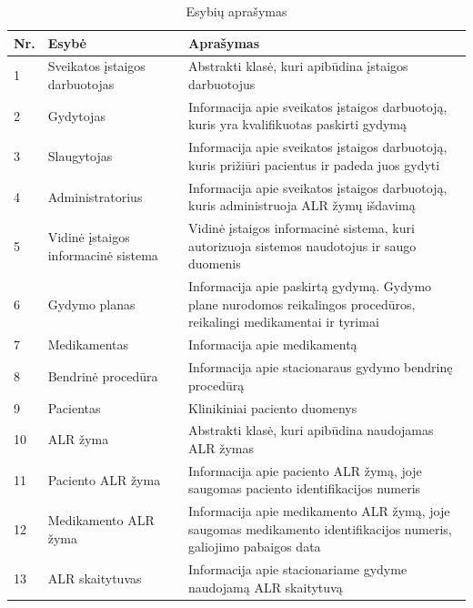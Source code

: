 \begin{table}[!ht]
    \centering
    \renewcommand{\arraystretch}{1.2}
    \renewcommand\thetable{7}
    \caption{Esybių aprašymas} 

    \begin{tabular}{|m{3em}|m{12em}|m{22em}|}
    \hline 
    \rowcolor[HTML]{EFEFEF} 
    Nr. & Esybė & Aprašymas \\ \hline

    1  &  Sveikatos įstaigos darbuotojas  & Abstrakti klasė, kuri apibūdina įstaigos darbuotojus      \\ \hline
    2  &  Gydytojas  & Informacija apie sveikatos įstaigos darbuotoją, kuris yra kvalifikuotas paskirti gydymą     \\ \hline
    3  &  Slaugytojas  & Informacija apie sveikatos įstaigos darbuotoją, kuris prižiūri pacientus ir padeda juos gydyti    \\ \hline
    4  &  Administratorius  & Informacija apie sveikatos įstaigos darbuotoją, kuris administruoja ALR žymų išdavimą       \\ \hline
    5  &  Vidinė įstaigos informacinė sistema  & Vidinė įstaigos informacinė sistema, kuri autorizuoja sistemos naudotojus ir saugo duomenis \\ \hline
    6  &  Gydymo planas  & Informacija apie paskirtą gydymą. Gydymo plane nurodomos reikalingos procedūros, reikalingi medikamentai ir tyrimai       \\ \hline
    7  &  Medikamentas  & Informacija apie medikamentą       \\ \hline
    8  &  Bendrinė procedūra  & Informacija apie stacionaraus gydymo bendrinę procedūrą       \\ \hline
    9  &  Pacientas  & Klinikiniai paciento duomenys       \\ \hline
    10  &  ALR žyma  & Abstrakti klasė, kuri apibūdina naudojamas ALR žymas    \\ \hline
    11  &  Paciento ALR žyma  & Informacija apie paciento ALR žymą, joje saugomas paciento identifikacijos numeris    \\ \hline
    12  &  Medikamento ALR žyma  & Informacija apie medikamento ALR žymą, joje saugomas medikamento identifikacijos numeris, galiojimo pabaigos data    \\ \hline
    13  &  ALR skaitytuvas  & Informacija apie stacionariame gydyme naudojamą ALR skaitytuvą \\ \hline


\end{tabular}
\end{table}
